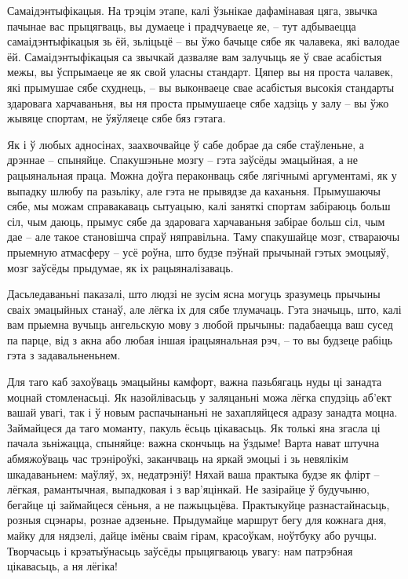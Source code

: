 Самаідэнтыфікацыя. На трэцім этапе, калі ўзьнікае дафамінавая цяга, звычка пачынае вас прыцягваць, вы думаеце і прадчуваеце яе, – тут адбываецца самаідэнтыфікацыя зь ёй, зьліцьцё – вы ўжо бачыце сябе як чалавека, які валодае ёй. Самаідэнтыфікацыя са звычкай дазваляе вам залучыць яе ў свае асабістыя межы, вы ўспрымаеце яе як свой уласны стандарт. Цяпер вы ня проста чалавек, які прымушае сябе схуднець, – вы выконваеце свае асабістыя высокія стандарты здаровага харчаваньня, вы ня проста прымушаеце сябе хадзіць у залу – вы ўжо жывяце спортам, не ўяўляеце сябе бяз гэтага.

Як і ў любых адносінах, заахвочвайце ў сабе добрае да сябе стаўленьне, а дрэннае – спыняйце. Спакушэньне мозгу – гэта заўсёды эмацыйная, а не рацыянальная праца. Можна доўга пераконваць сябе лягічнымі аргументамі, як у выпадку шлюбу па разьліку, але гэта не прывядзе да каханьня. Прымушаючы сябе, мы можам справакаваць сытуацыю, калі заняткі спортам забіраюць больш сіл, чым даюць, прымус сябе да здаровага харчаваньня забірае больш сіл, чым дае – але такое становішча спраў няправільна. Таму спакушайце мозг, ствараючы прыемную атмасферу – усё роўна, што будзе пэўнай прычынай гэтых эмоцыяў, мозг заўсёды прыдумае, як іх рацыяналізаваць.

Дасьледаваньні паказалі, што людзі не зусім ясна могуць зразумець прычыны сваіх эмацыйных станаў, але лёгка іх для сябе тлумачаць. Гэта значыць, што, калі вам прыемна вучыць ангельскую мову з любой прычыны: падабаецца ваш сусед па парце, від з акна або любая іншая ірацыянальная рэч, – то вы будзеце рабіць гэта з задавальненьнем.

Для таго каб захоўваць эмацыйны камфорт, важна пазьбягаць нуды ці занадта моцнай стомленасьці. Як назойлівасьць у заляцаньні можа лёгка спудзіць аб'ект вашай увагі, так і ў новым распачынаньні не захапляйцеся адразу занадта моцна. Займайцеся да таго моманту, пакуль ёсьць цікавасьць. Як толькі яна згасла ці пачала зьніжацца, спыняйце: важна скончыць на ўздыме! Варта нават штучна абмяжоўваць час трэніроўкі, заканчваць на яркай эмоцыі і зь невялікім шкадаваньнем: маўляў, эх, недатрэніў! Няхай ваша практыка будзе як флірт – лёгкая, рамантычная, выпадковая і з вар'яцінкай. Не зазірайце ў будучыню, бегайце ці займайцеся сёньня, а не пажыцьцёва. Практыкуйце разнастайнасьць, розныя сцэнары, рознае адзеньне. Прыдумайце маршрут бегу для кожнага дня, майку для нядзелі, дайце імёны сваім гірам, красоўкам, ноўтбуку або ручцы. Творчасьць і крэатыўнасьць заўсёды прыцягваюць увагу: нам патрэбная цікавасьць, а ня лёгіка!

